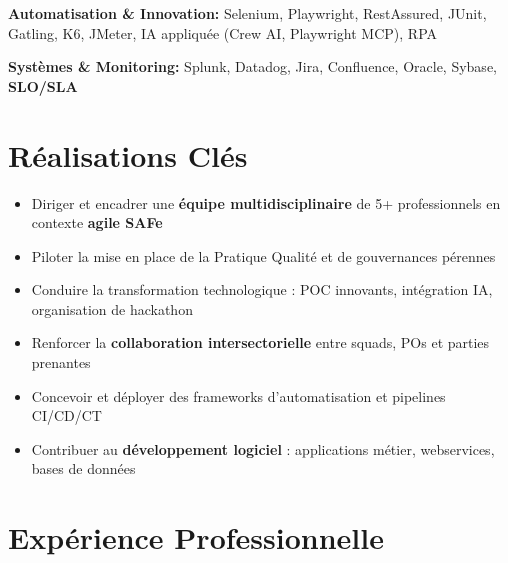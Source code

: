 \documentclass[11pt,a4paper]{article}
\newcommand{\highlight}[1]{\textbf{#1}}
\begin{document}
\textbf{Automatisation \& Innovation:} Selenium, Playwright, RestAssured, JUnit, Gatling, K6, JMeter, IA appliqu\'{e}e (Crew AI, Playwright MCP), RPA

\textbf{Syst\`{e}mes \& Monitoring:} Splunk, Datadog, Jira, Confluence, Oracle, Sybase, \highlight{SLO/SLA}

\section*{R\'{e}alisations Cl\'{e}s}
\begin{itemize}
    \item Diriger et encadrer une \highlight{\'{e}quipe multidisciplinaire} de 5+ professionnels en contexte \highlight{agile SAFe}
    \item Piloter la mise en place de la Pratique Qualit\'{e} et de gouvernances p\'{e}rennes
    \item Conduire la transformation technologique : POC innovants, int\'{e}gration IA, organisation de hackathon
    \item Renforcer la \highlight{collaboration intersectorielle} entre squads, POs et parties prenantes
    \item Concevoir et d\'{e}ployer des frameworks d'automatisation et pipelines CI/CD/CT
    \item Contribuer au \highlight{d\'{e}veloppement logiciel} : applications m\'{e}tier, webservices, bases de donn\'{e}es
\end{itemize}

\section*{Exp\'{e}rience Professionnelle}
\end{document}
